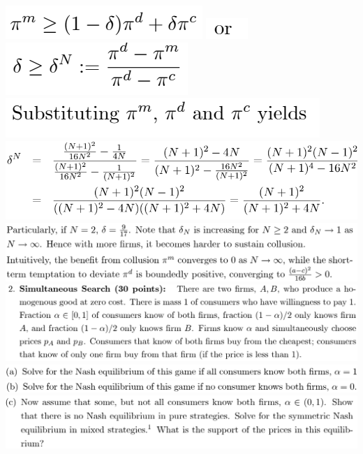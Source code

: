 \documentclass[8pt,landscape]{extarticle}
\begin{document}
\begin{multicols*}{3}
    \includegraphics[width=0.19\linewidth,keepaspectratio]{Screenshots/Screenshot 2024-03-11 170408.png}
    \includegraphics[width=0.04\linewidth,keepaspectratio]{Screenshots/Screenshot 2024-03-11 170411.png}
    \includegraphics[width=0.17\linewidth,keepaspectratio]{Screenshots/Screenshot 2024-03-11 170415.png}
    \includegraphics[width=0.3\linewidth,keepaspectratio]{Screenshots/Screenshot 2024-03-11 170419.png}
    \includegraphics[width=0.57\linewidth,keepaspectratio]{Screenshots/Screenshot 2024-03-11 170424.png}
    \includegraphics[width=0.71\linewidth,keepaspectratio]{Screenshots/Screenshot 2024-03-11 170431.png}
    \includegraphics[width=0.77\linewidth,keepaspectratio]{Screenshots/Screenshot 2024-03-11 170449.png}
    \includegraphics[width=0.73\linewidth,keepaspectratio]{Screenshots/Screenshot 2024-03-11 170454.png}
    \includegraphics[width=0.73\linewidth,keepaspectratio]{Screenshots/Screenshot 2024-03-11 170458.png}
    \includegraphics[width=0.74\linewidth,keepaspectratio]{Screenshots/Screenshot 2024-03-11 170502.png}

\end{multicols*}
\end{document}
